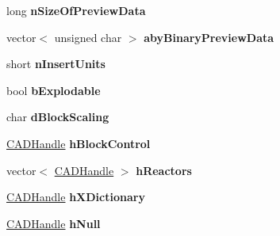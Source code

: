 \begin{DoxyCompactItemize}
\item 
long {\bfseries n\+Size\+Of\+Preview\+Data}\hypertarget{class_c_a_d_block_header_object_acde186c3a1b25007ec0f19d2506c511e}{}\label{class_c_a_d_block_header_object_acde186c3a1b25007ec0f19d2506c511e}

\item 
vector$<$ unsigned char $>$ {\bfseries aby\+Binary\+Preview\+Data}\hypertarget{class_c_a_d_block_header_object_ab281457052d4e3077a598ea9536552e3}{}\label{class_c_a_d_block_header_object_ab281457052d4e3077a598ea9536552e3}

\item 
short {\bfseries n\+Insert\+Units}\hypertarget{class_c_a_d_block_header_object_a9b674ff4dd9c3f292a5375c6737bfa3d}{}\label{class_c_a_d_block_header_object_a9b674ff4dd9c3f292a5375c6737bfa3d}

\item 
bool {\bfseries b\+Explodable}\hypertarget{class_c_a_d_block_header_object_a2759c253db7408159915e8b5b5c47bf4}{}\label{class_c_a_d_block_header_object_a2759c253db7408159915e8b5b5c47bf4}

\item 
char {\bfseries d\+Block\+Scaling}\hypertarget{class_c_a_d_block_header_object_a33d49b5316c006f7c1c6d5320cf42a6f}{}\label{class_c_a_d_block_header_object_a33d49b5316c006f7c1c6d5320cf42a6f}

\item 
\hyperlink{class_c_a_d_handle}{C\+A\+D\+Handle} {\bfseries h\+Block\+Control}\hypertarget{class_c_a_d_block_header_object_a26ba0e922a13dd98ea961a06354c4377}{}\label{class_c_a_d_block_header_object_a26ba0e922a13dd98ea961a06354c4377}

\item 
vector$<$ \hyperlink{class_c_a_d_handle}{C\+A\+D\+Handle} $>$ {\bfseries h\+Reactors}\hypertarget{class_c_a_d_block_header_object_aa813f1c798b7631ece64f2af900729d2}{}\label{class_c_a_d_block_header_object_aa813f1c798b7631ece64f2af900729d2}

\item 
\hyperlink{class_c_a_d_handle}{C\+A\+D\+Handle} {\bfseries h\+X\+Dictionary}\hypertarget{class_c_a_d_block_header_object_ad90e419b631010e8c1f376d16435ea8f}{}\label{class_c_a_d_block_header_object_ad90e419b631010e8c1f376d16435ea8f}

\item 
\hyperlink{class_c_a_d_handle}{C\+A\+D\+Handle} {\bfseries h\+Null}\hypertarget{class_c_a_d_block_header_object_a17d5469c83a3731cef785f73a477df14}{}\label{class_c_a_d_block_header_object_a17d5469c83a3731cef785f73a477df14}


\end{DoxyCompactItemize}
